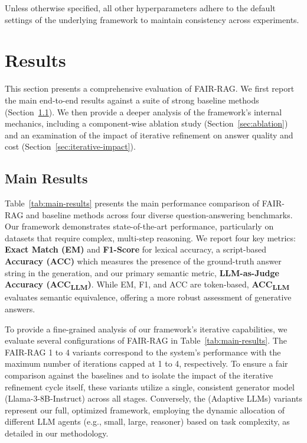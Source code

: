 \documentclass[11pt]{article}
\begin{document}
Unless otherwise specified, all other hyperparameters adhere to the default settings of the underlying framework to maintain consistency across experiments.

\section{Results}

This section presents a comprehensive evaluation of FAIR-RAG. We first report the main end-to-end results against a suite of strong baseline methods (Section~\ref{sec:main-results}). We then provide a deeper analysis of the framework's internal mechanics, including a component-wise ablation study (Section~\ref{sec:ablation}) and an examination of the impact of iterative refinement on answer quality and cost (Section~\ref{sec:iterative-impact}).

\subsection{Main Results}
\label{sec:main-results}

Table~\ref{tab:main-results} presents the main performance comparison of FAIR-RAG and baseline methods across four diverse question-answering benchmarks. Our framework demonstrates state-of-the-art performance, particularly on datasets that require complex, multi-step reasoning. We report four key metrics: \textbf{Exact Match (EM)} and \textbf{F1-Score} for lexical accuracy, a script-based \textbf{Accuracy (ACC)} which measures the presence of the ground-truth answer string in the generation, and our primary semantic metric, \textbf{LLM-as-Judge Accuracy (ACC\textsubscript{LLM})}. While EM, F1, and ACC are token-based, \textbf{ACC\textsubscript{LLM}} evaluates semantic equivalence, offering a more robust assessment of generative answers.

To provide a fine-grained analysis of our framework's iterative capabilities, we evaluate several configurations of FAIR-RAG in Table~\ref{tab:main-results}. The FAIR-RAG 1 to 4 variants correspond to the system's performance with the maximum number of iterations capped at 1 to 4, respectively. To ensure a fair comparison against the baselines and to isolate the impact of the iterative refinement cycle itself, these variants utilize a single, consistent generator model (Llama-3-8B-Instruct) across all stages. Conversely, the (Adaptive LLMs) variants represent our full, optimized framework, employing the dynamic allocation of different LLM agents (e.g., small, large, reasoner) based on task complexity, as detailed in our methodology.
\end{document}
